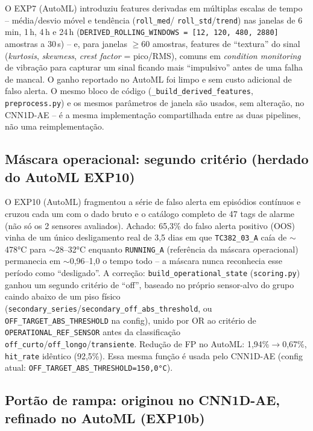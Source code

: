 \documentclass[11pt,a4paper]{article}
\begin{document}
O EXP7 (AutoML) introduziu features derivadas em múltiplas escalas de
tempo -- média/desvio móvel e tendência (\texttt{roll\_med}/
\texttt{roll\_std}/\texttt{trend}) nas janelas de 6\,min, 1\,h, 4\,h e
24\,h (\texttt{DERIVED\_ROLLING\_WINDOWS = [12, 120, 480, 2880]}
amostras a 30\,s) -- e, para janelas $\geq$60 amostras, features de
``textura'' do sinal (\emph{kurtosis}, \emph{skewness}, \emph{crest
factor} = pico/RMS), comuns em \emph{condition monitoring} de vibração
para capturar um sinal ficando mais ``impulsivo'' antes de uma falha de
mancal. O ganho reportado no AutoML foi limpo e sem custo adicional de
falso alerta. O mesmo bloco de código (\texttt{\_build\_derived\_features},
\texttt{preprocess.py}) e os mesmos parâmetros de janela são usados,
sem alteração, no CNN1D-AE -- é a mesma implementação compartilhada
entre as duas pipelines, não uma reimplementação.

\subsection{Máscara operacional: segundo critério (herdado do AutoML EXP10)}
\label{sec:mascara-migracao}

O EXP10 (AutoML) fragmentou a série de falso alerta em episódios
contínuos e cruzou cada um com o dado bruto e o catálogo completo de 47
tags de alarme (não só os 2 sensores avaliados). Achado: 65,3\% do
falso alerta positivo (OOS) vinha de um único desligamento real de 3,5
dias em que \texttt{TC382\_03\_A} caía de $\sim$478°C para
$\sim$28--32°C enquanto \texttt{RUNNING\_A} (referência da máscara
operacional) permanecia em $\sim$0,96--1,0 o tempo todo -- a máscara
nunca reconhecia esse período como ``desligado''. A correção:
\texttt{build\_operational\_state} (\texttt{scoring.py}) ganhou um
segundo critério de ``off'', baseado no próprio sensor-alvo do grupo
caindo abaixo de um piso físico
(\texttt{secondary\_series}/\texttt{secondary\_off\_abs\_threshold}, ou
\texttt{OFF\_TARGET\_ABS\_THRESHOLD} na config), unido por OR ao
critério de \texttt{OPERATIONAL\_REF\_SENSOR} antes da classificação
\texttt{off\_curto}/\texttt{off\_longo}/\texttt{transiente}. Redução de
FP no AutoML: 1,94\%$\to$0,67\%, \texttt{hit\_rate} idêntico (92,5\%).
Essa mesma função é usada pelo CNN1D-AE (config atual:
\texttt{OFF\_TARGET\_ABS\_THRESHOLD=150,0°C}).

\subsection{Portão de rampa: originou no CNN1D-AE, refinado no AutoML (EXP10b)}
\end{document}
